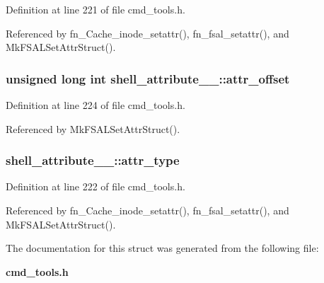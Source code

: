 Definition at line 221 of file cmd\_\-tools.h.

Referenced by fn\_\-Cache\_\-inode\_\-setattr(), fn\_\-fsal\_\-setattr(), and Mk\-FSALSet\-Attr\-Struct().
\subsubsection{\setlength{\rightskip}{0pt plus 5cm}unsigned long int {\bf shell\_\-attribute\_\-\_\-::attr\_\-offset}}\label{structshell__attribute_____o3}




Definition at line 224 of file cmd\_\-tools.h.

Referenced by Mk\-FSALSet\-Attr\-Struct().
\subsubsection{ {\bf shell\_\-attribute\_\-\_\-::attr\_\-type}}\label{structshell__attribute_____o1}




Definition at line 222 of file cmd\_\-tools.h.

Referenced by fn\_\-Cache\_\-inode\_\-setattr(), fn\_\-fsal\_\-setattr(), and Mk\-FSALSet\-Attr\-Struct().

The documentation for this struct was generated from the following file:\begin{CompactItemize}
\item 
{\bf cmd\_\-tools.h}\end{CompactItemize}
